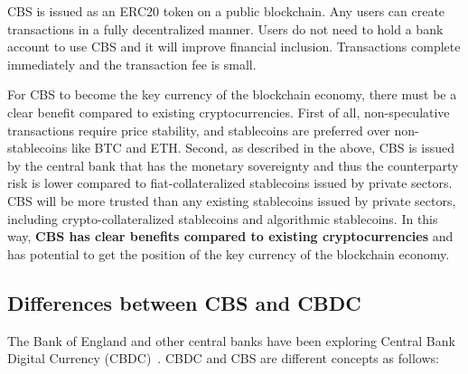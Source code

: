 \documentclass[dvipdfmx,a4paper]{article}
\begin{document}
CBS is issued as an ERC20 token on a public blockchain. Any users can create transactions in a fully decentralized manner. Users do not need to hold a bank account to use CBS and it will improve financial inclusion. Transactions complete immediately and the transaction fee is small.

For CBS to become the key currency of the blockchain economy, there must be a clear benefit compared to existing cryptocurrencies. First of all, non-speculative transactions require price stability, and stablecoins are preferred over non-stablecoins like BTC and ETH. Second, as described in the above, CBS is issued by the central bank that has the monetary sovereignty and thus the counterparty risk is lower compared to fiat-collateralized stablecoins issued by private sectors. CBS will be more trusted than any existing stablecoins issued by private sectors, including crypto-collateralized stablecoins and algorithmic stablecoins. In this way, \textbf{CBS has clear benefits compared to existing cryptocurrencies} and has potential to get the position of the key currency of the blockchain economy.

\subsection{Differences between CBS and CBDC}

The Bank of England and other central banks have been exploring Central Bank Digital Currency (CBDC)~\cite{cbdc1,cbdc2}. CBDC and CBS are different concepts as follows:
\end{document}
